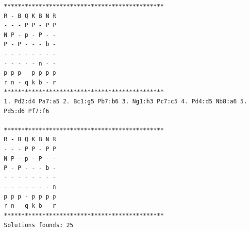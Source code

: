\documentclass[11pt]{article}
\begin{document}
\begin{verbatim}
**********************************************
R - B Q K B N R 
- - - P P - P P 
N P - p - P - - 
P - P - - - b - 
- - - - - - - - 
- - - - - n - - 
p p p - p p p p 
r n - q k b - r 
**********************************************
1. Pd2:d4 Pa7:a5 2. Bc1:g5 Pb7:b6 3. Ng1:h3 Pc7:c5 4. Pd4:d5 Nb8:a6 5. Pd5:d6 Pf7:f6 

**********************************************
R - B Q K B N R 
- - - P P - P P 
N P - p - P - - 
P - P - - - b - 
- - - - - - - - 
- - - - - - - n 
p p p - p p p p 
r n - q k b - r 
**********************************************
Solutions founds: 25
\end{verbatim}



\end{document}
